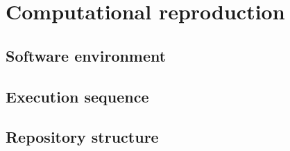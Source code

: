 \chapter{Computational reproduction}
\label{anexo:b}

\section{Software environment}
\label{sec:anexo-ambiente}

\section{Execution sequence}
\label{sec:anexo-execucao}

\section{Repository structure}
\label{sec:anexo-repo}
